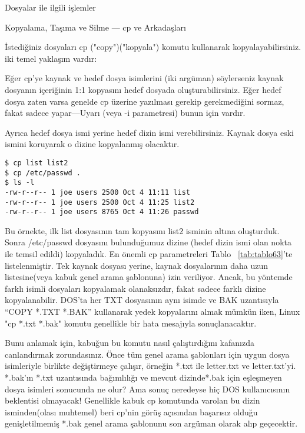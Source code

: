 \begin{section}{Dosyalar ile ilgili işlemler}
\begin{subsection}{Kopyalama, Taşıma ve Silme — cp ve Arkadaşları}

İstediğiniz dosyaları cp ("copy")("kopyala") komutu kullanarak kopyalayabilirsiniz. iki temel yaklaşım vardır:

Eğer cp'ye kaynak ve hedef dosya isimlerini (iki argüman) söylerseniz  kaynak dosyanın içeriğinin 1:1 kopyasını hedef dosyada oluşturabilirsiniz. Eğer hedef dosya zaten varsa genelde cp üzerine yazılması gerekip gerekmediğini sormaz, fakat sadece yapar—Uyarı (veya -i parametresi) bunun için vardır.

Ayrıca hedef dosya ismi yerine hedef dizin ismi verebilirsiniz. Kaynak dosya eski ismini koruyarak o dizine kopyalanmış olacaktır.

\begin{verbatim}
$ cp list list2
$ cp /etc/passwd .
$ ls -l
-rw-r--r-- 1 joe users 2500 Oct 4 11:11 list
-rw-r--r-- 1 joe users 2500 Oct 4 11:25 list2
-rw-r--r-- 1 joe users 8765 Oct 4 11:26 passwd
\end{verbatim}

Bu örnekte, ilk list dosyasının tam kopyasını list2 isminin altına oluşturduk. Sonra /etc/passwd dosyasını bulunduğumuz dizine (hedef dizin ismi olan nokta ile temsil edildi) kopyaladık. En önemli cp parametreleri Tablo ~\ref{tab:tablo63}'te listelenmiştir. Tek kaynak dosyası yerine, kaynak dosyalarının daha uzun listesine(veya kabuk genel arama şablonuna) izin veriliyor. Ancak, bu yöntemde farklı isimli dosyaları kopyalamak olanaksızdır, fakat sadece farklı dizine kopyalanabilir. DOS'ta her TXT dosyasının aynı isimde ve BAK uzantısıyla  “COPY *.TXT *.BAK” kullanarak yedek kopyalarını almak mümkün iken, Linux "cp *.txt *.bak" komutu genellikle bir hata mesajıyla sonuçlanacaktır.

Bunu anlamak için, kabuğun bu komutu nasıl çalıştırdığını kafanızda canlandırmak zorundasınız. Önce tüm genel arama şablonları için uygun dosya isimleriyle birlikte değiştirmeye çalışır, örneğin *.txt ile letter.txt ve letter.txt'yi. *.bak'ın *.txt uzantısında bağımlılığı ve mevcut dizinde*.bak için eşleşmeyen dosya isimleri sonucunda ne olur? Ama sonuç neredeyse hiç DOS kullanıcısının beklentisi olmayacak! Genellikle kabuk cp komutunda varolan bu dizin isminden(olası muhtemel) beri cp'nin görüş açısından başarısız olduğu genişletilmemiş *.bak genel arama şablonunu son argüman olarak alıp geçecektir.


\end{subsection}
\end{section}
